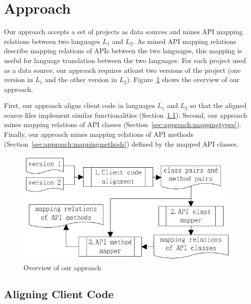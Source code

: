\section{Approach}
\label{sec:approach}

Our approach accepts a set of projects as data sources and mines
API mapping relations between two languages $L_1$ and $L_2$.
As mined API mapping relations describe mapping relations of APIs between
the two languages, this mapping is useful for language translation between the two languages.
For each project used as a data source, our approach requires
atleast two versions of the project (one version in $L_1$ and
the other version in $L_2$). Figure~\ref{fig:approach} shows
the overview of our approach.

First, our approach aligns client code in languages $L_1$ and $L_2$
so that the aligned source files implement similar functionalities
(Section~\ref{sec:approach:acc}). Second, our approach mines
mapping relations of API classes (Section~\ref{sec:approach:mappingtypes}).
Finally, our approach mines mapping relations of API
methods (Section~\ref{sec:approach:mappingmethods}) defined by the mapped
API classes.

\begin{figure}[t]
\centering
\includegraphics[scale=1,clip]{figure/approach.eps}\vspace*{-3ex}
 \caption{Overview of our approach}\vspace*{-3.5ex}
 \label{fig:approach}
\end{figure}

\subsection{Aligning Client Code}
\label{sec:approach:acc}

